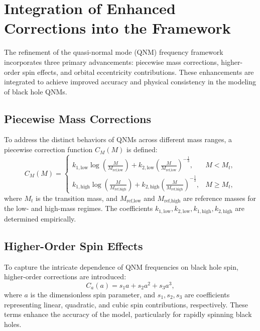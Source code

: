 \documentclass[12]{amsart}
\theoremstyle{plain}
\begin{document}
\section{Integration of Enhanced Corrections into the Framework}

The refinement of the quasi-normal mode (QNM) frequency framework incorporates three primary advancements: piecewise mass corrections, higher-order spin effects, and orbital eccentricity contributions. These enhancements are integrated to achieve improved accuracy and physical consistency in the modeling of black hole QNMs.

\subsection{Piecewise Mass Corrections}

To address the distinct behaviors of QNMs across different mass ranges, a piecewise correction function $C_M(M)$ is defined:\
\begin{equation}
    C_M(M) = \begin{cases} 
        k_{1,\text{low}} \log\left(\frac{M}{M_\text{ref,low}}\right) + k_{2,\text{low}} \left(\frac{M}{M_\text{ref,low}}\right)^{-\frac{1}{3}}, & M < M_t, \\
        k_{1,\text{high}} \log\left(\frac{M}{M_\text{ref,high}}\right) + k_{2,\text{high}} \left(\frac{M}{M_\text{ref,high}}\right)^{-\frac{1}{3}}, & M \geq M_t,
    \end{cases}
\end{equation}
where $M_t$ is the transition mass, and $M_\text{ref,low}$ and $M_\text{ref,high}$ are reference masses for the low- and high-mass regimes. The coefficients $k_{1,\text{low}}, k_{2,\text{low}}, k_{1,\text{high}}, k_{2,\text{high}}$ are determined empirically.

\subsection{Higher-Order Spin Effects}

To capture the intricate dependence of QNM frequencies on black hole spin, higher-order corrections are introduced:\
\begin{equation}
    C_a(a) = s_1 a + s_2 a^2 + s_3 a^3,
\end{equation}
where $a$ is the dimensionless spin parameter, and $s_1, s_2, s_3$ are coefficients representing linear, quadratic, and cubic spin contributions, respectively. These terms enhance the accuracy of the model, particularly for rapidly spinning black holes.
\end{document}
